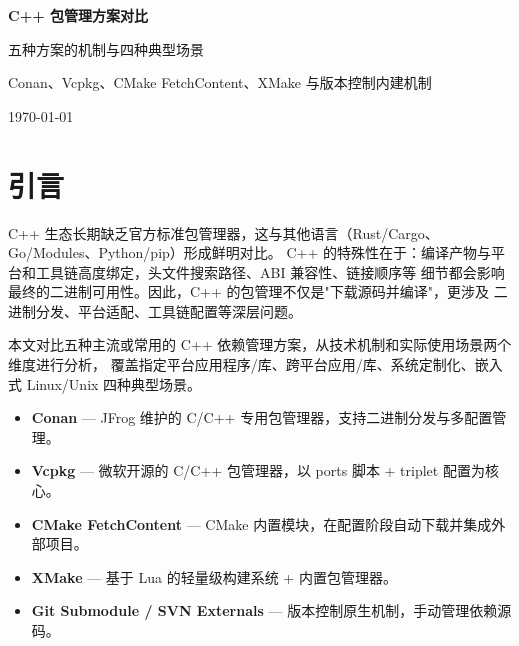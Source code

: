 \documentclass[12pt,a4paper,fontset=fandol]{ctexbook}
\begin{document}
\frontmatter

\begin{titlepage}
\centering
\vspace*{4cm}
{\Huge\bfseries C++ 包管理方案对比\par}
\vspace{1cm}
{\LARGE 五种方案的机制与四种典型场景\par}
\vspace{0.4cm}
{\Large Conan、Vcpkg、CMake FetchContent、XMake 与版本控制内建机制\par}
\vfill
{\large \today\par}
\end{titlepage}

\tableofcontents

\mainmatter

\cleardoublepage

\section{引言}

C++ 生态长期缺乏官方标准包管理器，这与其他语言（Rust/Cargo、Go/Modules、Python/pip）形成鲜明对比。
C++ 的特殊性在于：编译产物与平台和工具链高度绑定，头文件搜索路径、ABI 兼容性、链接顺序等
细节都会影响最终的二进制可用性。因此，C++ 的包管理不仅是"下载源码并编译"，更涉及
二进制分发、平台适配、工具链配置等深层问题。

本文对比五种主流或常用的 C++ 依赖管理方案，从技术机制和实际使用场景两个维度进行分析，
覆盖指定平台应用程序/库、跨平台应用/库、系统定制化、嵌入式 Linux/Unix 四种典型场景。

\begin{note}[ title={本文覆盖的五种方案}]
\begin{itemize}[nosep]
  \item \textbf{Conan} --- JFrog 维护的 C/C++ 专用包管理器，支持二进制分发与多配置管理。
  \item \textbf{Vcpkg} --- 微软开源的 C/C++ 包管理器，以 ports 脚本 + triplet 配置为核心。
  \item \textbf{CMake FetchContent} --- CMake 内置模块，在配置阶段自动下载并集成外部项目。
  \item \textbf{XMake} --- 基于 Lua 的轻量级构建系统 + 内置包管理器。
  \item \textbf{Git Submodule / SVN Externals} --- 版本控制原生机制，手动管理依赖源码。
\end{itemize}
\end{note}
\end{document}
